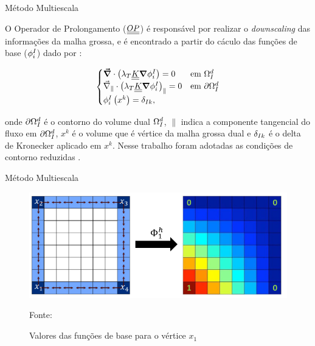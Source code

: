 \documentclass[professionalfont]{beamer}
\begin{document}
\begin{frame}{Método Multiescala}
    
    \small 
    O Operador de Prolongamento ($\underline{\underline{OP}}$) é responsável por realizar o \textit{downscaling} das informações da malha grossa, e é encontrado a partir do cáculo das funções de base ($\phi^{I}_{i}$) dado por \cite{Zhou2012, Wang2014}:

    \begin{equation}
        \label{eq:multiescala.1}
        \begin{cases}
            \mbox{\boldmath$ \vec{\nabla} $} \cdot \left( \lambda_{T} \underline{\underline{K}} \mbox{\boldmath$ \nabla $} \phi^{I}_{i} \right) = 0 & \text{em } \Omega_{I}^{d}\\
            \vec{\nabla}_{\parallel} \cdot \left( \lambda_{T} \underline{\underline{K}} \mbox{\boldmath$ \nabla $} \phi^{I}_{i} \right)_{\parallel} = 0 & \text{em } \partial \Omega_{I}^{d}\\
            \phi^{I}_{i} \left( x^{k}\right) = \delta_{Ik},
        \end{cases}
    \end{equation}

    onde $\partial \Omega_{I}^{d}$ é o contorno do volume dual $\Omega_{I}^{d}$, $\parallel$ indica a componente tangencial do fluxo em $\partial \Omega_{I}^{d}$, $x^{k}$ é o volume que é vértice da malha grossa dual e $\delta_{Ik}$ é o delta de Kronecker aplicado em $x^{k}$. Nesse trabalho foram adotadas as condições de contorno reduzidas \cite{Arthur_diss,Mazlumi_2021}.
\end{frame}

\begin{frame}{Método Multiescala}
    \begin{figure}[!ht]
        \caption{Valores das funções de base para o vértice $x_{1}$}
        \centering
        \includegraphics[scale=0.4]{./imgs/op_example.png}    
        \label{fig:operador_method.1}

        {\footnotesize Fonte: \cite{Hajibeygi_2020}}
    \end{figure}
\end{frame}
\end{document}
